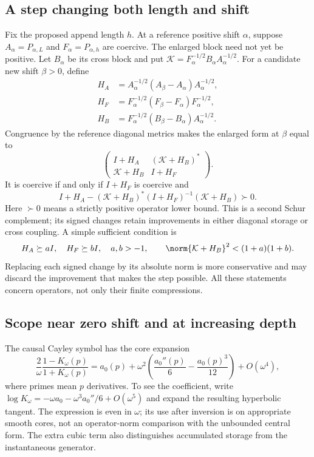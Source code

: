 \subsection{A step changing both length and shift}

Fix the proposed append length $h$. At a reference positive shift
$\alpha$, suppose $A_\alpha=P_{\alpha,L}$ and
$F_\alpha=P_{\alpha,h}$ are coercive. The enlarged block need
not yet be positive. Let $B_\alpha$ be its cross block and put
$\mathcal K=F_\alpha^{-1/2}B_\alpha A_\alpha^{-1/2}$.
For a candidate new shift $\beta>0$, define
\begin{align}
 H_A&=A_\alpha^{-1/2}(A_\beta-A_\alpha)A_\alpha^{-1/2},\\
 H_F&=F_\alpha^{-1/2}(F_\beta-F_\alpha)F_\alpha^{-1/2},\\
 H_B&=F_\alpha^{-1/2}(B_\beta-B_\alpha)A_\alpha^{-1/2}.
\end{align}
Congruence by the reference diagonal metrics makes the enlarged
form at $\beta$ equal to
\[
 \begin{pmatrix}
 I+H_A&(\mathcal K+H_B)^*\\
 \mathcal K+H_B&I+H_F
 \end{pmatrix}.
\]
It is coercive if and only if $I+H_F$ is coercive and
\begin{equation}\label{eq:si-joint}
 \boxed{I+H_A-(\mathcal K+H_B)^*(I+H_F)^{-1}
                     (\mathcal K+H_B)\succ0.}
\end{equation}
Here $\succ0$ means a strictly positive operator lower bound.
This is a second Schur complement; its signed changes retain
improvements in either diagonal storage or cross coupling.
A simple sufficient condition is
\[
 H_A\succeq aI,\quad H_F\succeq bI,\quad a,b>-1,\qquad
 \norm{\mathcal K+H_B}^2<(1+a)(1+b).
\]
Replacing each signed change by its absolute norm is more
conservative and may discard the improvement that makes the step
possible. All these statements concern operators, not only their
finite compressions.

\subsection{Scope near zero shift and at increasing depth}

The causal Cayley symbol has the core expansion
\begin{equation}
 \frac2\omega\frac{1-K_\omega(p)}{1+K_\omega(p)}
 =a_0(p)+\omega^2\left(\frac{a_0''(p)}6
                         -\frac{a_0(p)^3}{12}\right)+O(\omega^4),
\end{equation}
where primes mean $p$ derivatives. To see the coefficient, write
$\log K_\omega=-\omega a_0-\omega^3a_0''/6+O(\omega^5)$
and expand the resulting hyperbolic tangent. The expression is
even in $\omega$; its use after inversion is on appropriate smooth
cores, not an operator-norm comparison with the unbounded central
form. The extra cubic term also distinguishes accumulated storage
from the instantaneous generator.

